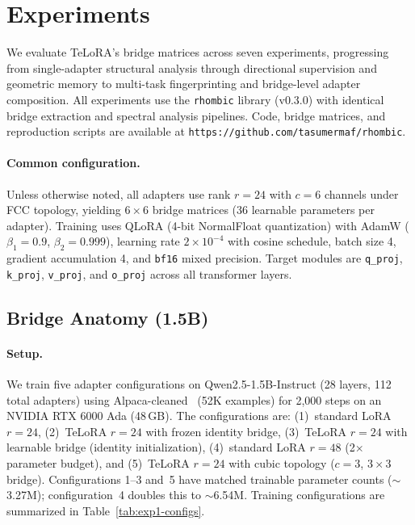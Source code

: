 
\section{Experiments}
\label{sec:experiments}

We evaluate TeLoRA's bridge matrices across seven experiments,
progressing from single-adapter structural analysis through directional
supervision and geometric memory to multi-task fingerprinting and
bridge-level adapter composition. All experiments use the
\texttt{rhombic} library (v0.3.0) with identical bridge extraction and
spectral analysis pipelines. Code, bridge matrices, and reproduction
scripts are available at \texttt{https://github.com/tasumermaf/rhombic}.

\paragraph{Common configuration.}
Unless otherwise noted, all adapters use rank $r = 24$ with $c = 6$
channels under FCC topology, yielding $6 \times 6$ bridge matrices
(36 learnable parameters per adapter). Training uses QLoRA (4-bit
NormalFloat quantization) with AdamW ($\beta_1 = 0.9$, $\beta_2 = 0.999$),
learning rate $2 \times 10^{-4}$ with cosine schedule, batch size 4,
gradient accumulation 4, and \texttt{bf16} mixed precision. Target modules
are \texttt{q\_proj}, \texttt{k\_proj}, \texttt{v\_proj}, and
\texttt{o\_proj} across all transformer layers.

\subsection{Bridge Anatomy (1.5B)}
\label{sec:exp-anatomy-1b}

\paragraph{Setup.} We train five adapter configurations on
Qwen2.5-1.5B-Instruct (28 layers, 112 total adapters) using
Alpaca-cleaned~\cite{alpaca} (52K examples) for 2,000 steps on an NVIDIA
RTX 6000 Ada (48\,GB). The configurations are: (1)~standard LoRA $r\!=\!24$,
(2)~TeLoRA $r\!=\!24$ with frozen identity bridge, (3)~TeLoRA
$r\!=\!24$ with learnable bridge (identity initialization),
(4)~standard LoRA $r\!=\!48$ (2$\times$ parameter budget), and
(5)~TeLoRA $r\!=\!24$ with cubic topology ($c\!=\!3$, $3 \times 3$
bridge). Configurations 1--3 and~5 have matched trainable parameter counts
($\sim$3.27M); configuration~4 doubles this to $\sim$6.54M. Training
configurations are summarized in Table~\ref{tab:exp1-configs}.

